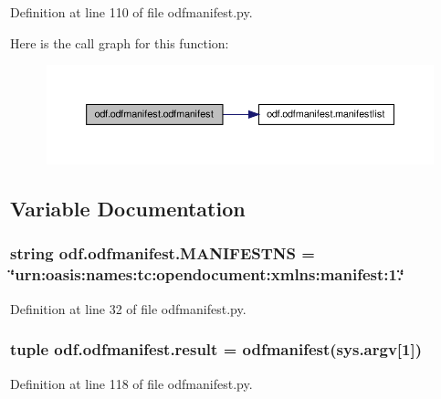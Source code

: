 Definition at line 110 of file odfmanifest.\+py.



Here is the call graph for this function\+:
\nopagebreak
\begin{figure}[H]
\begin{center}
\leavevmode
\includegraphics[width=350pt]{namespaceodf_1_1odfmanifest_a69af946eb54c4a75e75cef5611d6fcef_cgraph}
\end{center}
\end{figure}




\subsection{Variable Documentation}
\hypertarget{namespaceodf_1_1odfmanifest_a66286c05d5031965957b26b57b7bbfbd}{
\subsubsection[{M\+A\+N\+I\+F\+E\+S\+T\+N\+S}]{\setlength{\rightskip}{0pt plus 5cm}string odf.\+odfmanifest.\+M\+A\+N\+I\+F\+E\+S\+T\+N\+S = \char`\"{}urn\+:oasis\+:names\+:tc\+:opendocument\+:xmlns\+:manifest\+:1.\char`\"{}}}\label{namespaceodf_1_1odfmanifest_a66286c05d5031965957b26b57b7bbfbd}


Definition at line 32 of file odfmanifest.\+py.

\hypertarget{namespaceodf_1_1odfmanifest_a1641ce31eefa41ae260f4bd5785b37b3}{
\subsubsection[{result}]{\setlength{\rightskip}{0pt plus 5cm}tuple odf.\+odfmanifest.\+result = {\bf odfmanifest}(sys.\+argv\mbox{[}1\mbox{]})}}\label{namespaceodf_1_1odfmanifest_a1641ce31eefa41ae260f4bd5785b37b3}


Definition at line 118 of file odfmanifest.\+py.

